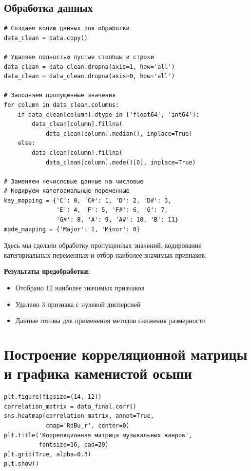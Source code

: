\documentclass[12pt,a4paper]{report}
\begin{document}
\subsection{Обработка данных}

\begin{lstlisting}
# Создаем копию данных для обработки
data_clean = data.copy()

# Удаляем полностью пустые столбцы и строки
data_clean = data_clean.dropna(axis=1, how='all')
data_clean = data_clean.dropna(axis=0, how='all')

# Заполняем пропущенные значения
for column in data_clean.columns:
    if data_clean[column].dtype in ['float64', 'int64']:
        data_clean[column].fillna(
            data_clean[column].median(), inplace=True)
    else:
        data_clean[column].fillna(
            data_clean[column].mode()[0], inplace=True)

# Заменяем нечисловые данные на числовые
# Кодируем категориальные переменные
key_mapping = {'C': 0, 'C#': 1, 'D': 2, 'D#': 3, 
               'E': 4, 'F': 5, 'F#': 6, 'G': 7, 
               'G#': 8, 'A': 9, 'A#': 10, 'B': 11}
mode_mapping = {'Major': 1, 'Minor': 0}
\end{lstlisting}

Здесь мы сделали обработку пропущенных значений, кодирование категориальных переменных и отбор наиболее значимых признаков.

\textbf{Результаты предобработки:}
\begin{itemize}
    \item Отобрано 12 наиболее значимых признаков
    \item Удалено 3 признака с нулевой дисперсией
    \item Данные готовы для применения методов снижения размерности
\end{itemize}

\section{Построение корреляционной матрицы и графика каменистой осыпи}

\begin{lstlisting}
plt.figure(figsize=(14, 12))
correlation_matrix = data_final.corr()
sns.heatmap(correlation_matrix, annot=True, 
            cmap='RdBu_r', center=0)
plt.title('Корреляционная матрица музыкальных жанров', 
          fontsize=16, pad=20)
plt.grid(True, alpha=0.3)
plt.show()
\end{lstlisting}
\end{document}
